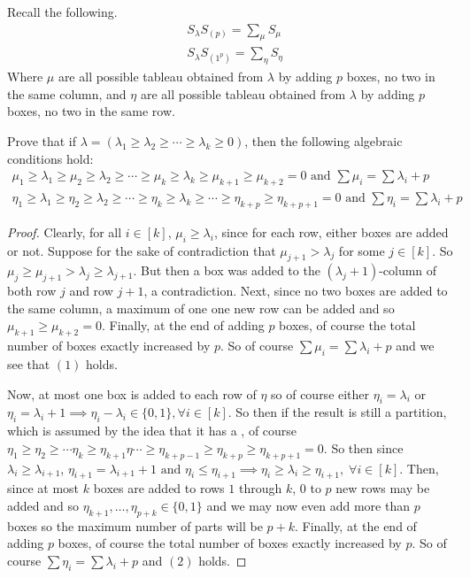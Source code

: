 \documentclass[addpoints,10pt]{exam}
\theoremstyle{plain}
\theoremstyle{definition}
\newtheorem{prob}[thm]{Problem}
\theoremstyle{plain}
\theoremstyle{plain}
\theoremstyle{definition}
\let\oldprob\prob
\let\endoldprob\endprob
\renewenvironment{prob}
  {\begin{singlespace}\oldprob}
  {\endoldprob\end{singlespace}}
\begin{document}
\newpage
\setcounter{thm}{0}
\renewcommand{\thethm}{2.\arabic{thm}}
\begin{prob}
Recall the following.
\begin{align*}
&S_{\lambda}S_{(p)}=\sum_{\mu} S_{\mu}\\
&S_{\lambda}S_{(1^{p})}=\sum_{\eta} S_{\eta}
\end{align*}
Where $\mu$ are all possible tableau obtained from $\lambda$ by adding $p$ boxes, no two in the same column, and $\eta$ are all possible tableau obtained from $\lambda$ by adding $p$ boxes, no two in the same row.

Prove that if $\lambda = (\lambda_{1}\geq \lambda_{2}\geq \cdots \geq \lambda_{k}\geq 0)$, then the following algebraic conditions hold:
\begin{align}
  \mu_{1}\geq \lambda_{1}\geq \mu_{2}\geq \lambda_{2}\geq \cdots \geq \mu_{k}\geq \lambda_{k}\geq \mu_{k+1}\geq \mu_{k+2}=0\text{ and }\sum \mu_{i}=\sum \lambda_{i}+p \\
  \eta_{1}\geq \lambda_{1}\geq \eta_{2}\geq \lambda_{2}\geq \cdots \geq \eta_{k}\geq \lambda_{k}\geq\cdots \geq \eta_{k+p}\geq \eta_{k+p+1}=0\text{ and }\sum \eta_{i}=\sum \lambda_{i}+p
\end{align}
\end{prob}
\begin{proof}
Clearly, for all $i\in [k]$, $\mu_{i}\geq \lambda_{i}$, since for each row, either boxes are added or not. Suppose for the sake of contradiction that $\mu_{j+1}>\lambda_{j}$ for some $j\in [k].$ So $\mu_{j}\geq \mu_{j+1}>\lambda_{j}\geq \lambda_{j+1}$. But then a box was added to the $(\lambda_{j}+1)$-column of both row $j$ and row $j+1$, a contradiction. Next, since no two boxes are added to the same column, a maximum of one one new row can be added and so $\mu_{k+1}\geq \mu_{k+2}=0$. Finally, at the end of adding $p$ boxes, of course the total number of boxes exactly increased by $p$. So of course $\sum \mu_{i}=\sum \lambda_{i}+p$ and we see that $(1)$ holds.

Now, at most one box is added to each row of $\eta$ so of course either $\eta_{i}=\lambda_{i}$ or $\eta_{i}=\lambda_{i}+1\implies \eta_{i}-\lambda_{i}\in \{0,1\},\forall i\in [k].$ So then if the result is still a partition, which is assumed by the idea that it has a , of course $\eta_{1}\geq \eta_{2}\geq \cdots \eta_{k}\geq \eta_{k+1}\eta\cdots \geq \eta_{k+p-1}\geq \eta_{k+p}\geq \eta_{k+p+1}=0$. So then since $\lambda_{i}\geq \lambda_{i+1}$, $\eta_{i+1}=\lambda_{i+1}+1\text{ and } \eta_{i}\leq \eta_{i+1}\implies \eta_{i}\geq \lambda_{i}\geq \eta_{i+1},\;\forall i\in [k]$. Then, since at most $k$ boxes are added to rows $1$ through $k$, $0$ to $p$ new rows may be added and so $\eta_{k+1},\hdots,\eta_{p+k}\in\{0,1\}$ and we may now even add more than $p$ boxes so the maximum number of parts will be $p+k$. Finally, at the end of adding $p$ boxes, of course the total number of boxes exactly increased by $p$. So of course $\sum \eta_{i}=\sum \lambda_{i}+p$ and $(2)$ holds.

\end{proof}
\end{document}
